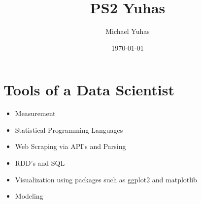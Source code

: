 \documentclass{article}
\title{PS2 Yuhas}
\author{Michael Yuhas }
\date{\today}
\begin{document}
\maketitle

\section{Tools of a Data Scientist}
\begin{itemize}
    \item Measurement
    \item Statistical Programming Languages
    \item Web Scraping via API's and Parsing
    \item RDD's and SQL
    \item Visualization using packages such as ggplot2 and matplotlib
    \item Modeling
\end{itemize}
\end{document}
